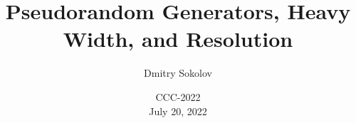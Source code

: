 

\titlegraphic{
    
}


\title[]{
    Pseudorandom Generators, Heavy Width, and Resolution
}

\author{
    Dmitry Sokolov
}  


\date{CCC-2022\\ July 20, 2022}

\newcommand{\SPCR}{\PrSys{S}\text{-}\PrSys{PCR}}
\newcommand{\SSOS}{\PrSys{S}\text{-}\PrSys{SOS}}




    \maketitle

    
    
    
    

